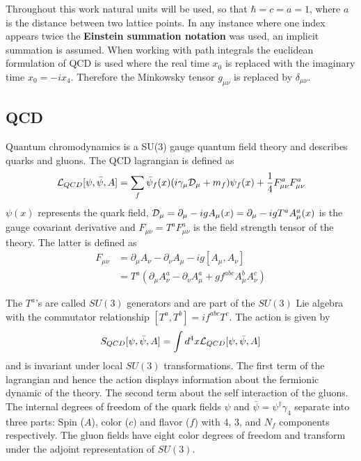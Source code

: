 Throughout this work natural units will be used, so that $\hbar = c = a = 1$, where $a$ is the distance between two lattice points.	In any instance where one index appears twice the \textbf{Einstein summation notation} was used, an implicit summation is assumed. When working with path integrals the euclidean formulation of QCD is used where the real time $x_0$ is replaced with the imaginary time $x_0 = -ix_4$. Therefore the Minkowsky tensor $g_{\mu\nu}$ is replaced by $\delta_{\mu\nu}$.
	
\subsection{QCD}
	Quantum chromodynamics is a SU(3) gauge quantum field theory and describes quarks and gluons. The QCD lagrangian is defined as \cite{qcd1_script_philipsen}
	\begin{equation}
	    \mathcal{L}_{QCD}[\psi,\bar{\psi}, A] = \sum_f \bar{\psi}_f(x)(i\gamma_\mu\mathcal{D}_\mu + m_f)\psi_f(x) + \frac{1}{4}F^a_{\mu\nu}F^a_{\mu\nu}
	    \label{qcd_lagrangian}
	\end{equation}
	$\psi(x)$ represents the quark field, $\mathcal{D}_\mu = \partial_\mu - igA_\mu(x) = \partial_\mu-igT^aA^a_\mu(x)$ is the gauge covariant derivative and $F_{\mu\nu} = T^aF^a_{\mu\nu}$ is the field strength tensor of the theory. The latter is defined as
	\begin{equation}\label{strenth_tensor}
	\begin{aligned}
	    F_{\mu\nu} &= \partial_\mu A_\nu - \partial_\nu A_\mu-ig[A_\mu,A_\nu]\\
	    &= T^a(\partial_\mu A^a_\nu - \partial_\nu A^a_\mu + g f^{abc}A^b_\mu A^c_\nu)
	\end{aligned}
	\end{equation}
	
	The $T^a$'s are called $SU(3)$ generators and are part of the $SU(3)$ Lie algebra with the commutator relationship $[T^a,T^b]=if^{abc}T^c$. The action is given by
	\begin{equation}
	    S_{QCD}[\psi,\bar{\psi}, A] = \int d^4x \mathcal{L}_{QCD}[\psi,\bar{\psi}, A]
	\end{equation}
	and is invariant under local $SU(3)$ transformations. The first term of the lagrangian and hence the action displays information about the fermionic dynamic of the theory. The second term about the self interaction of the gluons.\\
	
	The internal degrees of freedom of the quark fields $\psi$ and $\bar{\psi}=\psi^\dagger\gamma_4$ separate into three parts: Spin ($A$), color ($c$) and flavor ($f$) with 4, 3, and $N_f$ components respectively. The gluon fields have eight color degrees of freedom and transform under the adjoint representation of $SU(3)$.